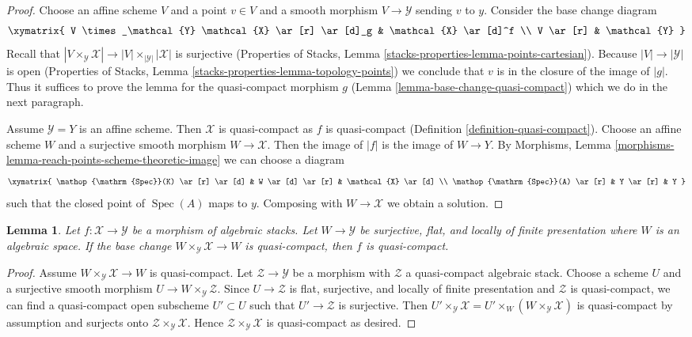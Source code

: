\documentclass{stacks-project}
\theoremstyle{plain}
\newtheorem{lemma}[subsection]{Lemma}
\theoremstyle{definition}
\theoremstyle{remark}
\numberwithin{equation}{subsection}
\def\Spec{\mathop{\mathrm{Spec}}}
\begin{document}
\begin{proof}
Choose an affine scheme $V$ and a point $v \in V$ and a smooth morphism
$V \to \mathcal{Y}$ sending $v$ to $y$. Consider the base change diagram
$$
\xymatrix{
V \times_\mathcal{Y} \mathcal{X} \ar[r] \ar[d]_g & \mathcal{X} \ar[d]^f \\
V \ar[r] & \mathcal{Y}
}
$$
Recall that $|V \times_\mathcal{Y} \mathcal{X}| \to
|V| \times_{|\mathcal{Y}|} |\mathcal{X}|$ is surjective
(Properties of Stacks, Lemma \ref{stacks-properties-lemma-points-cartesian}).
Because $|V| \to |\mathcal{Y}|$ is open
(Properties of Stacks, Lemma \ref{stacks-properties-lemma-topology-points})
we conclude that $v$ is in the closure of the image of $|g|$.
Thus it suffices to prove the lemma for the quasi-compact morphism $g$
(Lemma \ref{lemma-base-change-quasi-compact}) which we do in the next
paragraph.

\medskip\noindent
Assume $\mathcal{Y} = Y$ is an affine scheme. Then $\mathcal{X}$
is quasi-compact as $f$ is quasi-compact
(Definition \ref{definition-quasi-compact}).
Choose an affine scheme $W$ and a surjective smooth morphism
$W \to \mathcal{X}$. Then the image of $|f|$ is the image
of $W \to Y$.
By Morphisms, Lemma \ref{morphisms-lemma-reach-points-scheme-theoretic-image}
we can choose a diagram
$$
\xymatrix{
\Spec(K) \ar[r] \ar[d] & W \ar[d] \ar[r] & \mathcal{X} \ar[d] \\
\Spec(A) \ar[r] & Y \ar[r] & Y
}
$$
such that the closed point of $\Spec(A)$ maps to $y$.
Composing with $W \to \mathcal{X}$ we obtain a solution.
\end{proof}

\begin{lemma}
\label{lemma-check-quasi-compact-covering}
Let $f : \mathcal{X} \to \mathcal{Y}$ be a morphism of algebraic stacks.
Let $W \to \mathcal{Y}$ be surjective, flat, and locally of finite
presentation where $W$ is an algebraic space. If the base change
$W \times_\mathcal{Y} \mathcal{X} \to W$ is quasi-compact, then
$f$ is quasi-compact.
\end{lemma}

\begin{proof}
Assume $W \times_\mathcal{Y} \mathcal{X} \to W$ is quasi-compact.
Let $\mathcal{Z} \to \mathcal{Y}$ be a morphism with $\mathcal{Z}$
a quasi-compact algebraic stack. Choose a scheme $U$ and a surjective
smooth morphism
$U \to W \times_\mathcal{Y} \mathcal{Z}$.
Since $U \to \mathcal{Z}$ is flat, surjective, and locally of finite
presentation and $\mathcal{Z}$ is quasi-compact, we can find a
quasi-compact open subscheme $U' \subset U$ such that
$U' \to \mathcal{Z}$ is surjective.
Then
$U' \times_\mathcal{Y} \mathcal{X} =
U' \times_W (W \times_\mathcal{Y} \mathcal{X})$
is quasi-compact by assumption and surjects onto
$\mathcal{Z} \times_\mathcal{Y} \mathcal{X}$.
Hence $\mathcal{Z} \times_\mathcal{Y} \mathcal{X}$
is quasi-compact as desired.
\end{proof}
\end{document}
